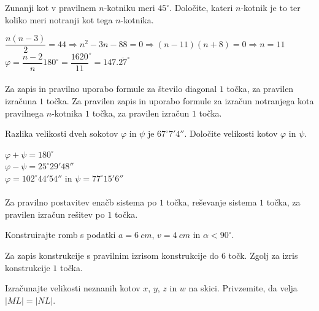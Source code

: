 \documentclass[addpoints]{exam}
\begin{document}
\begin{questions}


    \question[3]
    Zunanji kot v pravilnem $n$-kotniku meri $45^\circ$. Določite, kateri $n$-kotnik je to ter koliko meri notranji kot tega $n$-kotnika.

    \begin{solution}[6cm]
        $ \dfrac{n(n-3)}{2}=44 \Rightarrow n^2-3n-88=0 \Rightarrow (n-11)(n+8)=0 \Rightarrow n=11 $ \\
        $ \varphi=\dfrac{n-2}{n}180^\circ=\dfrac{1620}{11}^\circ=147.\overline{27}^\circ $ \\ \\
        Za zapis in pravilno uporabo formule za število diagonal $1$ točka, za pravilen izračuna $1$ točka. 
        Za pravilen zapis in uporabo formule za izračun notranjega kota pravilnega $n$-kotnika $1$ točka, za pravilen izračun $1$ točka.
    \end{solution}



    \question[5]
    Razlika velikosti dveh sokotov $\varphi$ in $\psi$ je $67^\circ 7' 4''$.
    Določite velikosti kotov $\varphi$ in $\psi$.

    \begin{solution}[5cm]
        $\varphi+\psi=180^\circ$ \\
        $\varphi-\psi=25^\circ 29' 48''$ \\
        $\varphi=102^\circ 44' 54''$ in $\psi=77^\circ 15' 6 ''$ \\ \\
        Za pravilno postavitev enačb sistema po $1$ točka, reševanje sistema $1$ točka, za pravilen izračun rešitev po $1$ točka.
    \end{solution}

    

    \newpage

    \question[6]
    Konstruirajte romb s podatki $a=6~cm$, $v=4~cm$ in $\alpha<90^\circ$.

    \begin{solution}[15cm]
        Za zapis konstrukcije s pravilnim izrisom konstrukcije do $6$ točk. Zgolj za izris konstrukcije $1$ točka.
    \end{solution}




    \newpage

    \question[4]
    Izračunajte velikosti neznanih kotov $x$, $y$, $z$ in $w$ na skici. Privzemite, da velja $|ML|=|NL|$.


\end{questions}
\end{document}
